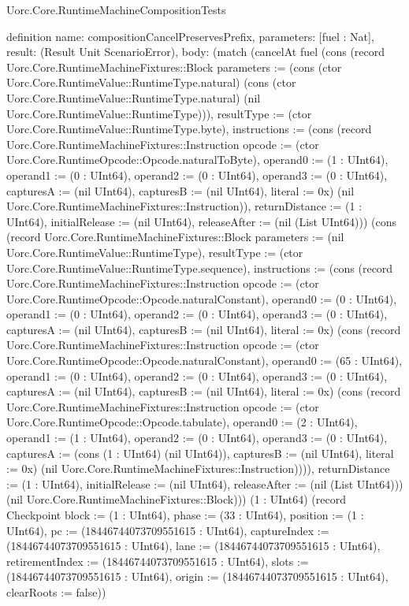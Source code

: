 \begin{lexlean}{Uorc.Core.RuntimeMachineCompositionTests}
\begin{semanticmodule}
definition{
  name: compositionCancelPreservesPrefix,
  parameters: [fuel : Nat],
  result: (Result Unit ScenarioError),
  body: (match (cancelAt fuel (cons (record Uorc.Core.RuntimeMachineFixtures::Block {parameters := (cons (ctor Uorc.Core.RuntimeValue::RuntimeType.natural) (cons (ctor Uorc.Core.RuntimeValue::RuntimeType.natural) (nil Uorc.Core.RuntimeValue::RuntimeType))), resultType := (ctor Uorc.Core.RuntimeValue::RuntimeType.byte), instructions := (cons (record Uorc.Core.RuntimeMachineFixtures::Instruction {opcode := (ctor Uorc.Core.RuntimeOpcode::Opcode.naturalToByte), operand0 := (1 : UInt64), operand1 := (0 : UInt64), operand2 := (0 : UInt64), operand3 := (0 : UInt64), capturesA := (nil UInt64), capturesB := (nil UInt64), literal := 0x}) (nil Uorc.Core.RuntimeMachineFixtures::Instruction)), returnDistance := (1 : UInt64), initialRelease := (nil UInt64), releaseAfter := (nil (List UInt64))}) (cons (record Uorc.Core.RuntimeMachineFixtures::Block {parameters := (nil Uorc.Core.RuntimeValue::RuntimeType), resultType := (ctor Uorc.Core.RuntimeValue::RuntimeType.sequence), instructions := (cons (record Uorc.Core.RuntimeMachineFixtures::Instruction {opcode := (ctor Uorc.Core.RuntimeOpcode::Opcode.naturalConstant), operand0 := (0 : UInt64), operand1 := (0 : UInt64), operand2 := (0 : UInt64), operand3 := (0 : UInt64), capturesA := (nil UInt64), capturesB := (nil UInt64), literal := 0x}) (cons (record Uorc.Core.RuntimeMachineFixtures::Instruction {opcode := (ctor Uorc.Core.RuntimeOpcode::Opcode.naturalConstant), operand0 := (65 : UInt64), operand1 := (0 : UInt64), operand2 := (0 : UInt64), operand3 := (0 : UInt64), capturesA := (nil UInt64), capturesB := (nil UInt64), literal := 0x}) (cons (record Uorc.Core.RuntimeMachineFixtures::Instruction {opcode := (ctor Uorc.Core.RuntimeOpcode::Opcode.tabulate), operand0 := (2 : UInt64), operand1 := (1 : UInt64), operand2 := (0 : UInt64), operand3 := (0 : UInt64), capturesA := (cons (1 : UInt64) (nil UInt64)), capturesB := (nil UInt64), literal := 0x}) (nil Uorc.Core.RuntimeMachineFixtures::Instruction)))), returnDistance := (1 : UInt64), initialRelease := (nil UInt64), releaseAfter := (nil (List UInt64))}) (nil Uorc.Core.RuntimeMachineFixtures::Block))) (1 : UInt64) (record Checkpoint {block := (1 : UInt64), phase := (33 : UInt64), position := (1 : UInt64), pc := (18446744073709551615 : UInt64), captureIndex := (18446744073709551615 : UInt64), lane := (18446744073709551615 : UInt64), retirementIndex := (18446744073709551615 : UInt64), slots := (18446744073709551615 : UInt64), origin := (18446744073709551615 : UInt64), clearRoots := false}))
}
\end{semanticmodule}
\end{lexlean}
